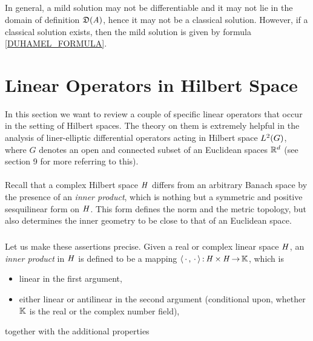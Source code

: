 \documentclass[11pt,twoside]{article}
\def\G{G}
\begin{document}
\subparagraph{}
In general,
a mild solution may not be differentiable and it may not lie in the domain
of definition $\mathfrak{D}(\mathit{A})$,
hence it may not be a classical solution.
However,
if a classical solution exists,
then the mild solution is given by formula \eqref{DUHAMEL_FORMULA}.

\section{Linear Operators in Hilbert Space}                                    %
In this section we want to review a couple of specific linear operators
that occur in the setting of Hilbert spaces.
The theory on them is extremely helpful in the analysis
of liner-elliptic differential operators acting in Hilbert space $\Lh$,
where $\G$ denotes an open and connected subset of an Euclidean spaces ${\mathbb{R}}^d$
(see section 9 for more referring to this).

\paragraph{} %
Recall that
a complex Hilbert space $\mathit{H}$ differs from an arbitrary Banach space
by the presence of an \textit{inner product},
which is nothing but a symmetric and positive sesquilinear form on $\mathit{H}$.
This form defines the norm and the metric topology,
but also determines the inner geometry to be close
to that of an Euclidean space.

\subparagraph{} %
Let us make these assertions precise.
Given a real or complex linear space $\mathit{H}$,
an \textit{inner product} in $\mathit{H}$ is defined to be a mapping
$\langle \,\cdot\,,\,\cdot\, \rangle{\,:\,} \mathit{H} {\,\times\,} \mathit{H} {\,\to\,} {\mathbb{K}}$,
which is

\begin{itemize}[leftmargin=35pt]
\item[(I-1)]
linear in the first argument,

\item[(I-2)]
either linear or antilinear in the second argument (conditional upon,
whether ${\mathbb{K}}$ is the real or the complex number field),
\end{itemize}
together with the additional properties
\end{document}
